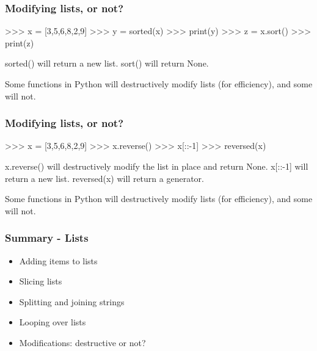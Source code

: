 \documentclass{beamer}
\begin{document}
\begin{frame}[fragile]
\frametitle{Modifying lists, or not?}
\begin{code}
>>> x = [3,5,6,8,2,9]
>>> y = sorted(x)
>>> print(y)
>>> z = x.sort()
>>> print(z)
\end{code}

sorted() will return a new list. sort() will return None.

\bigskip

Some functions in Python will destructively modify lists (for
efficiency), and some will not. 
\end{frame}

\begin{frame}[fragile]
\frametitle{Modifying lists, or not?}
\begin{code}
>>> x = [3,5,6,8,2,9]
>>> x.reverse()
>>> x[::-1]
>>> reversed(x)
\end{code}

x.reverse() will destructively modify the list in place and return None. x[::-1] will
return a new list. reversed(x) will return a generator. 

\bigskip

Some functions in Python will destructively modify lists (for
efficiency), and some will not. 
\end{frame}

\begin{frame}[fragile]
\frametitle{Summary - Lists}
\begin{itemize}
\item Adding items to lists
\item Slicing lists
\item Splitting and joining strings
\item Looping over lists
\item Modifications: destructive or not?
\end{itemize}
\end{frame}
\end{document}
